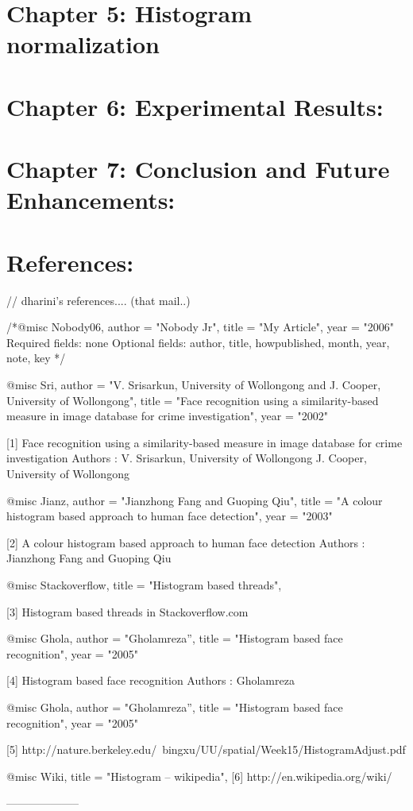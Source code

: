 \documentclass[12pt,a4paper]{book}
\begin{document}
\section{Chapter 5: Histogram normalization}
\section{Chapter 6: Experimental Results:}
\section{Chapter 7: Conclusion and Future Enhancements:}

\section{References:}

// dharini’s references.... (that mail..)

/*@misc{ Nobody06,
       author = "Nobody Jr",
       title = "My Article",
       year = "2006" }
Required fields: none
Optional fields: author, title, howpublished, month, year, note, key */


@misc{ Sri,
       author = "V. Srisarkun, University of Wollongong and J. Cooper, University of Wollongong",
       title = "Face recognition using a similarity-based measure in image database for crime investigation",
       year = "2002" }

[1] Face recognition using a similarity-based measure
in image database for crime investigation
Authors : V. Srisarkun, University of Wollongong
J. Cooper, University of Wollongong

@misc{ Jianz,
       author = "Jianzhong Fang and Guoping Qiu",
       title = "A colour histogram based approach to human face detection",
       year = "2003" }

[2] A colour histogram based approach to human face detection
Authors : Jianzhong Fang and Guoping Qiu



@misc{ Stackoverflow,
       title = "Histogram based  threads",
}

[3] Histogram based  threads in Stackoverflow.com


@misc{ Ghola,
       author = "Gholamreza”,
       title = "Histogram based face recognition",
       year = "2005" }

[4] Histogram based face recognition
   Authors :  Gholamreza

@misc{ Ghola,
       author = "Gholamreza”,
       title = "Histogram based face recognition",
       year = "2005" }

[5] http://nature.berkeley.edu/~bingxu/UU/spatial/Week15/HistogramAdjust.pdf

@misc{ Wiki,
       title = "Histogram -- wikipedia",
}
[6] http://en.wikipedia.org/wiki/

--------------------


\end{document}
